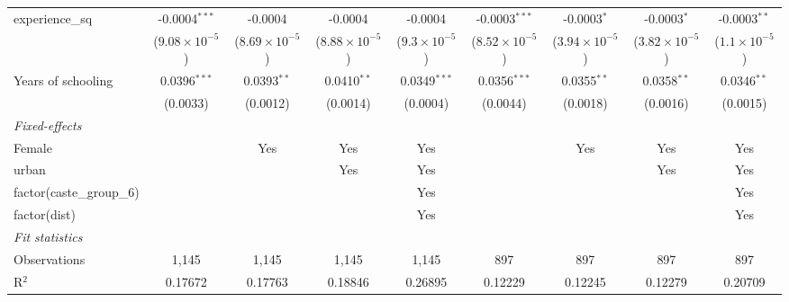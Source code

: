 \begin{table}[htbp]
\begin{tabular}{lcccccccc}
      experience\_sq            & -0.0004$^{***}$         & -0.0004                 & -0.0004                 & -0.0004                & -0.0003$^{***}$         & -0.0003$^{*}$           & -0.0003$^{*}$           & -0.0003$^{**}$\\   
                                & ($9.08\times 10^{-5}$)  & ($8.69\times 10^{-5}$)  & ($8.88\times 10^{-5}$)  & ($9.3\times 10^{-5}$)  & ($8.52\times 10^{-5}$)  & ($3.94\times 10^{-5}$)  & ($3.82\times 10^{-5}$)  & ($1.1\times 10^{-5}$)\\    
      Years of schooling        & 0.0396$^{***}$          & 0.0393$^{**}$           & 0.0410$^{**}$           & 0.0349$^{***}$         & 0.0356$^{***}$          & 0.0355$^{**}$           & 0.0358$^{**}$           & 0.0346$^{**}$\\   
                                & (0.0033)                & (0.0012)                & (0.0014)                & (0.0004)               & (0.0044)                & (0.0018)                & (0.0016)                & (0.0015)\\   
      \midrule
      \emph{Fixed-effects}\\
      Female                    &                         & Yes                     & Yes                     & Yes                    &                         & Yes                     & Yes                     & Yes\\  
      urban                     &                         &                         & Yes                     & Yes                    &                         &                         & Yes                     & Yes\\  
      factor(caste\_group\_6)   &                         &                         &                         & Yes                    &                         &                         &                         & Yes\\  
      factor(dist)              &                         &                         &                         & Yes                    &                         &                         &                         & Yes\\  
      \midrule
      \emph{Fit statistics}\\
      Observations              & 1,145                   & 1,145                   & 1,145                   & 1,145                  & 897                     & 897                     & 897                     & 897\\  
      R$^2$                     & 0.17672                 & 0.17763                 & 0.18846                 & 0.26895                & 0.12229                 & 0.12245                 & 0.12279                 & 0.20709\\  

\end{tabular}
\end{table}
